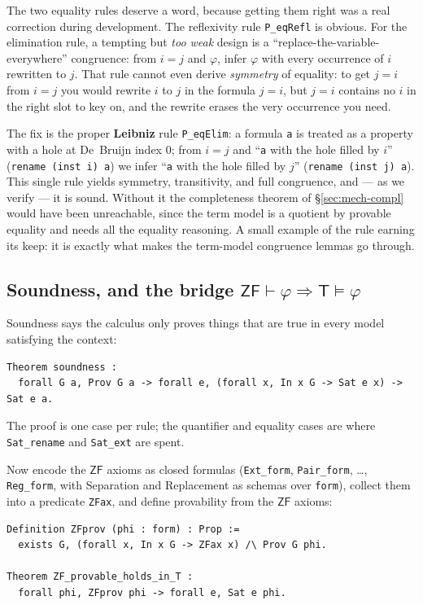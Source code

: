 \documentclass[11pt]{article}
\theoremstyle{plain}
\theoremstyle{definition}
\newcommand{\ZF}{\mathsf{ZF}}
\renewcommand{\ZF}{\textsf{ZF}}
\newcommand{\T}{\textsf{T}}
\newcommand{\proves}{\vdash}
\newcommand{\cq}[1]{\lstinline[basicstyle=\ttfamily]|#1|}
\begin{document}
The two equality rules deserve a word, because getting them right was a real
correction during development. The reflexivity rule \cq{P_eqRefl} is obvious. For
the elimination rule, a tempting but \emph{too weak} design is a
``replace-the-variable-everywhere'' congruence: from $i = j$ and $\varphi$, infer
$\varphi$ with every occurrence of $i$ rewritten to $j$. That rule cannot even
derive \emph{symmetry} of equality: to get $j = i$ from $i = j$ you would rewrite
$i$ to $j$ in the formula $j = i$, but $j = i$ contains no $i$ in the right slot to
key on, and the rewrite erases the very occurrence you need.

The fix is the proper \textbf{Leibniz} rule \cq{P_eqElim}: a formula \cq{a} is
treated as a property with a hole at De~Bruijn index $0$; from $i = j$ and
``\cq{a} with the hole filled by $i$'' (\cq{rename (inst i) a}) we infer ``\cq{a}
with the hole filled by $j$'' (\cq{rename (inst j) a}). This single rule yields
symmetry, transitivity, and full congruence, and --- as we verify --- it is sound.
Without it the completeness theorem of \S\ref{sec:mech-compl} would have been
unreachable, since the term model is a quotient by provable equality and needs all
the equality reasoning. A small example of the rule earning its keep: it is exactly
what makes the term-model congruence lemmas go through.

\subsection{Soundness, and the bridge $\ZF \proves \varphi \Rightarrow \T \models \varphi$}

Soundness says the calculus only proves things that are true in every model
satisfying the context:

\begin{lstlisting}
Theorem soundness :
  forall G a, Prov G a -> forall e, (forall x, In x G -> Sat e x) -> Sat e a.
\end{lstlisting}

The proof is one case per rule; the quantifier and equality cases are where
\cq{Sat_rename} and \cq{Sat_ext} are spent.

Now encode the $\ZF$ axioms as closed formulas (\cq{Ext_form}, \cq{Pair_form},
\dots, \cq{Reg_form}, with Separation and Replacement as schemas over \cq{form}),
collect them into a predicate \cq{ZFax}, and define provability from the $\ZF$
axioms:

\begin{lstlisting}
Definition ZFprov (phi : form) : Prop :=
  exists G, (forall x, In x G -> ZFax x) /\ Prov G phi.

Theorem ZF_provable_holds_in_T :
  forall phi, ZFprov phi -> forall e, Sat e phi.
\end{lstlisting}
\end{document}
